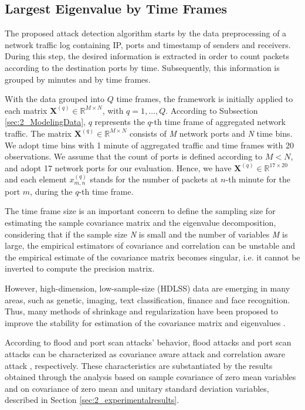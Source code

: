 \subsection{Largest Eigenvalue by Time Frames}
\label{sec:2_prop_LargestEigenvaluebyTimeFrames}

The proposed attack detection algorithm starts by the data preprocessing of a network traffic log containing IP, ports and timestamp of senders and receivers. During this step, the desired information is extracted in order to count packets according to the destination ports by time. Subsequently, this information is grouped by minutes and by time frames.

With the data grouped into $Q$ time frames, the framework is initially applied to each matrix $\pmb{X}^{(q)} \in \mathbb{R}^{M\times{N}}$, with $q = 1, \ldots, Q$. According to Subsection \ref{sec:2_ModelingData}, $q$ represents the $q$-th time frame of aggregated network traffic. The matrix $\pmb{X}^{(q)} \in \mathbb{R}^{M \times N}$ consists of \emph{M} network ports and \emph{N} time bins. We adopt time bins with 1 minute of aggregated traffic and time frames with 20 observations. We assume that the count of ports is defined according to $M < N$, and adopt 17 network ports for our evaluation. Hence, we have $\pmb{X}^{(q)} \in \mathbb{R}^{17\times{20}}$ and each element $x_{m,n}^{(q)}$ stands for the number of packets at $n$-th minute for the port $m$, during the $q$-th time frame.

The time frame size is an important concern to define the sampling size for estimating the sample covariance matrix and the eigenvalue decomposition, considering that if the sample size \emph{N} is small and the number of variables \emph{M} is large, the empirical estimators of covariance and correlation can be unstable and the empirical estimate of the covariance matrix becomes singular, i.e. it cannot be inverted to compute the precision matrix. 

However, high-dimension, low-sample-size (HDLSS) data are emerging in many areas, such as genetic, imaging, text classification, finance and face recognition. Thus, many methods of shrinkage and regularization have been proposed to improve the stability for estimation of the covariance matrix \cite{chen2011robust} and eigenvalues \cite{yata2010effective}.

According to flood and port scan attacks' behavior, flood attacks and port scan attacks can be characterized as covariance aware attack \citep{jin2004covariance} and correlation aware attack \citep{lakhina2005mining}, respectively. These characteristics are substantiated by the results obtained through the analysis based on sample covariance of zero mean variables and on covariance of zero mean and unitary standard deviation variables, described in Section \ref{sec:2_experimentalresults}.

